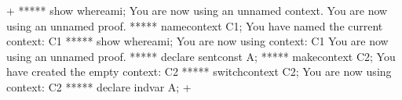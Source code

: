 



\gfexample+
   ***** show whereami;
   You are now using an unnamed context.
   You are now using an unnamed proof.
   ***** namecontext C1;
   You have named the current context: C1
   ***** show whereami;
   You are now using context: C1
   You are now using an unnamed proof.
   ***** declare sentconst A;
   ***** makecontext C2;
   You have created the empty context: C2
   ***** switchcontext C2;
   You are now using context: C2
   ***** declare indvar A;
+
